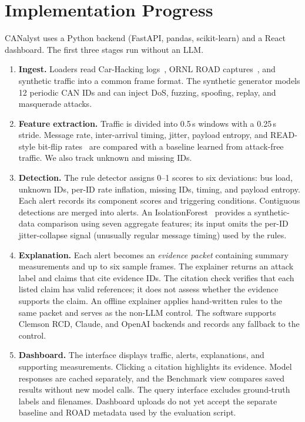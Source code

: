 \documentclass[sigconf]{acmart}
\begin{document}
\section{Implementation Progress}\label{sec:impl}
CANalyst uses a Python backend (FastAPI, pandas, scikit-learn) and a React dashboard. The first three stages run without an LLM.
\begin{enumerate}
  \item \textbf{Ingest.} Loaders read Car-Hacking logs~\cite{song2020carhacking}, ORNL ROAD captures~\cite{verma2024road}, and synthetic traffic into a common frame format. The synthetic generator models 12 periodic CAN IDs and can inject DoS, fuzzing, spoofing, replay, and masquerade attacks.
  \item \textbf{Feature extraction.} Traffic is divided into 0.5\,s windows with a 0.25\,s stride. Message rate, inter-arrival timing, jitter, payload entropy, and READ-style bit-flip rates~\cite{marchetti2019read} are compared with a baseline learned from attack-free traffic. We also track unknown and missing IDs.
  \item \textbf{Detection.} The rule detector assigns 0--1 scores to six deviations: bus load, unknown IDs, per-ID rate inflation, missing IDs, timing, and payload entropy. Each alert records its component scores and triggering conditions. Contiguous detections are merged into alerts. An IsolationForest~\cite{liu2008isolation} provides a synthetic-data comparison using seven aggregate features; its input omits the per-ID jitter-collapse signal (unusually regular message timing) used by the rules.
  \item \textbf{Explanation.} Each alert becomes an \emph{evidence packet} containing summary measurements and up to six sample frames. The explainer returns an attack label and claims that cite evidence IDs. The citation check verifies that each listed claim has valid references; it does not assess whether the evidence supports the claim. An offline explainer applies hand-written rules to the same packet and serves as the non-LLM control. The software supports Clemson RCD, Claude, and OpenAI backends and records any fallback to the control.
  \item \textbf{Dashboard.} The interface displays traffic, alerts, explanations, and supporting measurements. Clicking a citation highlights its evidence. Model responses are cached separately, and the Benchmark view compares saved results without new model calls. The query interface excludes ground-truth labels and filenames. Dashboard uploads do not yet accept the separate baseline and ROAD metadata used by the evaluation script.
\end{enumerate}
\end{document}
